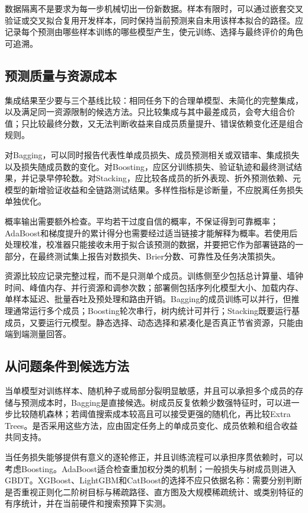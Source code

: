 数据隔离不是要求为每一步机械切出一份新数据。样本有限时，可以通过嵌套交叉验证或交叉拟合复用开发样本，同时保持当前预测来自未用该样本拟合的路径。应记录每个预测由哪些样本训练的哪些模型产生，使元训练、选择与最终评价的角色可追溯。

\subsection{预测质量与资源成本}
\label{sec:ensemble-quality-resource}

集成结果至少要与三个基线比较：相同任务下的合理单模型、未简化的完整集成，以及满足同一资源限制的候选方法。只比较集成与其中最差成员，会夸大组合价值；只比较最终分数，又无法判断收益来自成员质量提升、错误依赖变化还是组合规则。

对Bagging，可以同时报告代表性单成员损失、成员预测相关或双错率、集成损失以及损失随成员数的变化。对Boosting，应区分训练损失、验证轨迹和最终测试结果，并记录早停轮数。对Stacking，应比较各成员的折外表现、折外预测依赖、元模型的新增验证收益和全链路测试结果。多样性指标是诊断量，不应脱离任务损失单独优化。

概率输出需要额外检查。平均若干过度自信的概率，不保证得到可靠概率；AdaBoost和梯度提升的累计得分也需要经过适当链接才能解释为概率。若使用后处理校准，校准器只能接收未用于拟合该预测的数据，并要把它作为部署链路的一部分，在最终测试集上报告对数损失、Brier分数、可靠性及任务决策损失。

资源比较应记录完整过程，而不是只测单个成员。训练侧至少包括总计算量、墙钟时间、峰值内存、并行资源和调参次数；部署侧包括序列化模型大小、加载内存、单样本延迟、批量吞吐及预处理和路由开销。Bagging的成员训练可以并行，但推理通常运行多个成员；Boosting轮次串行，树内统计可并行；Stacking既要运行基成员，又要运行元模型。静态选择、动态选择和紧凑化是否真正节省资源，只能由端到端测量回答。

\subsection{从问题条件到候选方法}
\label{sec:ensemble-method-selection}

当单模型对训练样本、随机种子或局部分裂明显敏感，并且可以承担多个成员的存储与预测成本时，Bagging是直接候选。树成员反复依赖少数强特征时，可以进一步比较随机森林；若阈值搜索成本较高且可以接受更强的随机化，再比较Extra Trees。是否采用这些方法，应由固定任务上的单成员变化、成员依赖和组合收益共同支持。

当任务损失能够提供有意义的逐轮修正，并且训练流程可以承担序贯依赖时，可以考虑Boosting。AdaBoost适合检查重加权分类的机制；一般损失与树成员则进入GBDT。XGBoost、LightGBM和CatBoost的选择不应只依据名称：需要分别判断是否重视正则化二阶树目标与稀疏路径、直方图及大规模稀疏统计、或类别特征的有序统计，并在当前硬件和搜索预算下实测。

